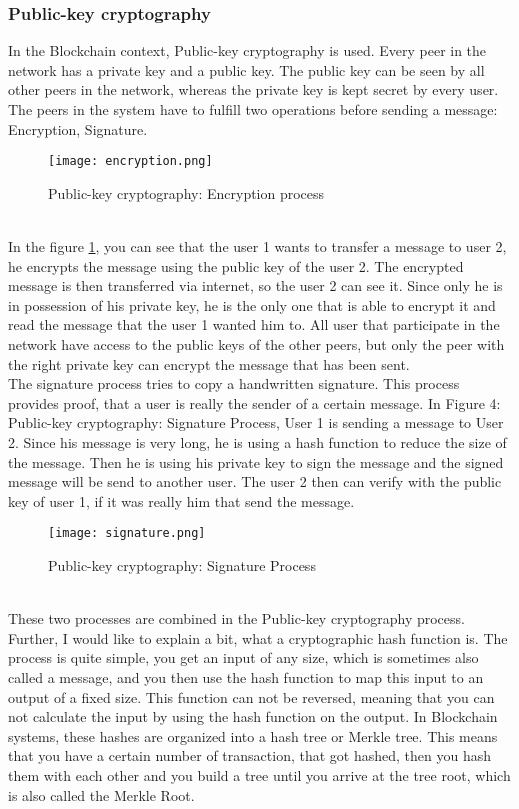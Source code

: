 \subsubsection{Public-key cryptography}
In the Blockchain context, Public-key cryptography is used. Every peer in the network has a private key and a public key. The public key can be seen by all other peers in the network, whereas the private key is kept secret by every user. The peers in the system have to fulfill two operations before sending a message: Encryption, Signature.
\begin{figure}[!ht]
    \centering
    \texttt{[image: encryption.png]}
    \label{fig:encryption}
    \caption{Public-key cryptography: Encryption process}
\end{figure} \\
In the figure \ref{fig:encryption}, you can see that the user 1 wants to transfer a message to user 2, he encrypts the message using the public key of the user 2. The encrypted message is then transferred via internet, so the user 2 can see it. Since only he is in possession of his private key, he is the only one that is able to encrypt it and read the message that the user 1 wanted him to. All user that participate in the network have access to the public keys of the other peers, but only the peer with the right private key can encrypt the message that has been sent.\\
The signature process tries to copy a handwritten signature. This process provides proof, that a user is really the sender of a certain message. In Figure 4: Public-key cryptography: Signature Process, User 1 is sending a message to User 2. Since his message is very long, he is using a hash function to reduce the size of the message. Then he is using his private key to sign the message and the signed message will be send to another user. The user 2 then can verify with the public key of user 1, if it was really him that send the message. \\
\begin{figure}[!ht]
    \centering
    \texttt{[image: signature.png]}
    \label{fig:signature}
    \caption{Public-key cryptography: Signature Process}
\end{figure} \\
These two processes are combined in the Public-key cryptography process.\\
Further, I would like to explain a bit, what a cryptographic hash function is. The process is quite simple, you get an input of any size, which is sometimes also called a message, and you then use the hash function to map this input to an output of a fixed size. This function can not be reversed, meaning that you can not calculate the input by using the hash function on the output. In Blockchain systems, these hashes are organized into a hash tree or Merkle tree. This means that you have a certain number of transaction, that got hashed, then you hash them with each other and you build a tree until you arrive at the tree root, which is also called the Merkle Root. 

